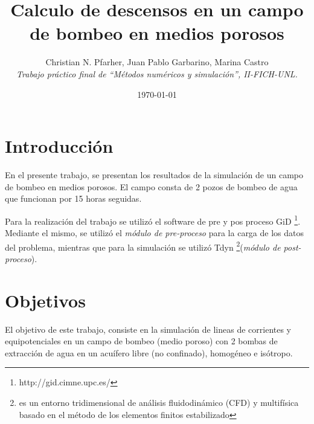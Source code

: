 \documentclass[10pt,a4paper,final]{article}
\begin{document}
\title{Calculo de descensos en un campo de bombeo en medios porosos}
\author{Christian N. Pfarher, Juan Pablo Garbarino, Marina Castro\\
\textit{Trabajo práctico final de ``Métodos numéricos y simulación'', II-FICH-UNL.}}
\date{\today}
\maketitle
\newpage
\tableofcontents
\newpage
\section{Introducción}
En el presente trabajo, se presentan los resultados de la simulación de un campo de bombeo en medios porosos. El campo
consta de 2 pozos de bombeo de agua que funcionan por 15 horas seguidas. 

Para la realización del trabajo se utilizó el software de pre y pos proceso GiD \footnote{http://gid.cimne.upc.es/}. Mediante el mismo, se utilizó el \emph{módulo de pre-proceso} para la carga de los datos del problema, mientras que para
la simulación se utilizó Tdyn \footnote{es un entorno tridimensional de análisis fluidodinámico (CFD) y multifísica basado en el método de los elementos finitos estabilizado}(\emph{módulo de post-proceso}).
\section{Objetivos}
El objetivo de este trabajo, consiste en la simulación de lineas de corrientes y equipotenciales en un campo de bombeo (medio poroso) con 2 bombas de extracción de agua en un acuífero libre (no confinado), homogéneo e isótropo.

\end{document}
